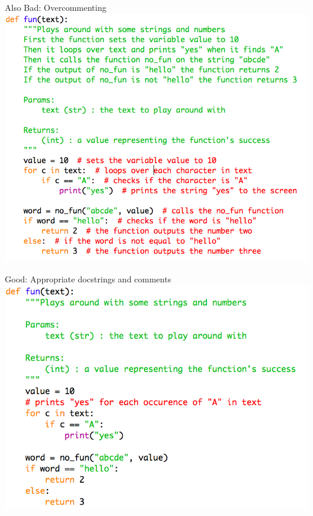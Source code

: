 \documentclass[week2]{csse1001}
\begin{document}
\begin{topic}{Also Bad: Overcommenting}
\includegraphics[scale=1]{bad_python/bad_comments}
\end{topic}

\begin{topic}{Good: Appropriate docstrings and comments}
\includegraphics[scale=1]{bad_python/good_comments}
\end{topic}
\end{document}
